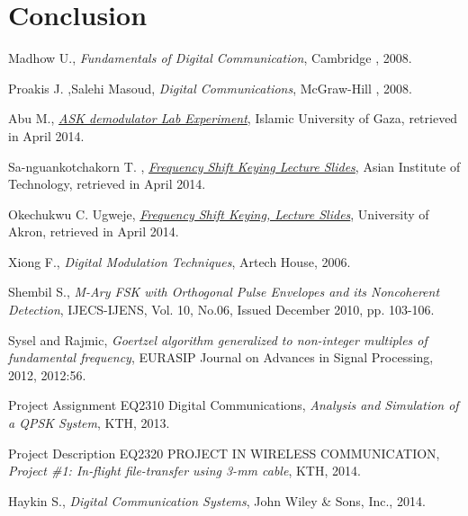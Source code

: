 \documentclass[12pt,a4paper,openright]{report}
\begin{document}
\chapter{Conclusion}


\begin{thebibliography}{1}

Madhow U., \emph{Fundamentals of Digital Communication}, Cambridge , 2008.

Proakis J. ,Salehi Masoud, \emph{Digital Communications}, McGraw-Hill , 2008.

Abu M., \href{http://site.iugaza.edu.ps/mabufoul/files/2010/09/Experiment-5.pdf}
{\emph{ASK demodulator Lab Experiment}},
Islamic University of Gaza, retrieved in April 2014.


Sa-nguankotchakorn T. , \href{http://www.tc.ait.ac.th/faculty/teerapat/AT77.11_Digital\%20Modulation\%20Techniques/III.Frequency_Shift_Keying.pdf}{\emph{Frequency Shift Keying Lecture Slides}}, Asian Institute of Technology, retrieved in April 2014.


Okechukwu C. Ugweje, \href{ugweje/web/Courses/Ee549/Handout/EE549F01Lecture37.pdf}{\emph{Frequency Shift Keying, Lecture Slides}},  University of Akron, retrieved in April 2014.


Xiong F., \emph{Digital Modulation Techniques}, Artech House, 2006.

Shembil S., \emph{M-Ary FSK with Orthogonal Pulse Envelopes and its Noncoherent Detection}, IJECS-IJENS, Vol. 10, No.06, Issued December 2010, pp. 103-106.

Sysel and Rajmic, \emph{Goertzel algorithm generalized to non-integer multiples of fundamental frequency}, EURASIP Journal on Advances in Signal Processing, 2012, 2012:56.

Project Assignment EQ2310 Digital Communications, \emph{Analysis and Simulation of a QPSK System}, KTH, 2013.

Project Description EQ2320 PROJECT IN WIRELESS COMMUNICATION, \emph{Project \#1: In-flight file-transfer using 3-mm cable}, KTH, 2014.

Haykin S., \emph{Digital Communication Systems}, John Wiley \& Sons, Inc., 2014.


\end{thebibliography}
\end{document}
